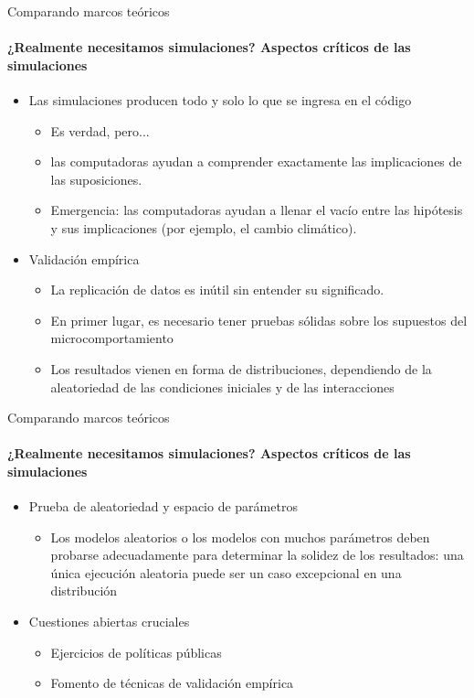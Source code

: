 \documentclass[11pt]{beamer}
\begin{document}
\begin{frame}
\begin{frame}{Comparando marcos teóricos}
\framesubtitle{¿Realmente necesitamos simulaciones? Aspectos críticos de las simulaciones}
    \begin{itemize}
        \item Las simulaciones producen todo y solo lo que se ingresa en el código
         \begin{itemize}
             \item Es verdad, pero...
             \item las computadoras ayudan a comprender exactamente las implicaciones de las suposiciones.
             \item Emergencia: las computadoras ayudan a llenar el vacío entre las hipótesis y sus implicaciones (por ejemplo, el cambio climático).
         \end{itemize}
\item Validación empírica
\begin{itemize}
     \item La replicación de datos es inútil sin entender su significado.
     \item En primer lugar, es necesario tener pruebas sólidas sobre los supuestos del microcomportamiento
\item Los resultados vienen en forma de distribuciones, dependiendo de la aleatoriedad de las condiciones iniciales y de las interacciones
\end{itemize}
    \end{itemize}
\end{frame}

\begin{frame}{Comparando marcos teóricos}
\framesubtitle{¿Realmente necesitamos simulaciones? Aspectos críticos de las simulaciones}
\begin{itemize}
    \item Prueba de aleatoriedad y espacio de parámetros
     \begin{itemize}
         \item Los modelos aleatorios o los modelos con muchos parámetros deben probarse adecuadamente para determinar la solidez de los resultados: una única ejecución aleatoria puede ser un caso excepcional en una distribución
     \end{itemize}
     \item Cuestiones abiertas cruciales
     \begin{itemize}
         \item Ejercicios de políticas públicas
\item Fomento de técnicas de validación empírica
    \end{itemize}
\end{itemize}
\end{frame}


\end{frame}
\end{document}
